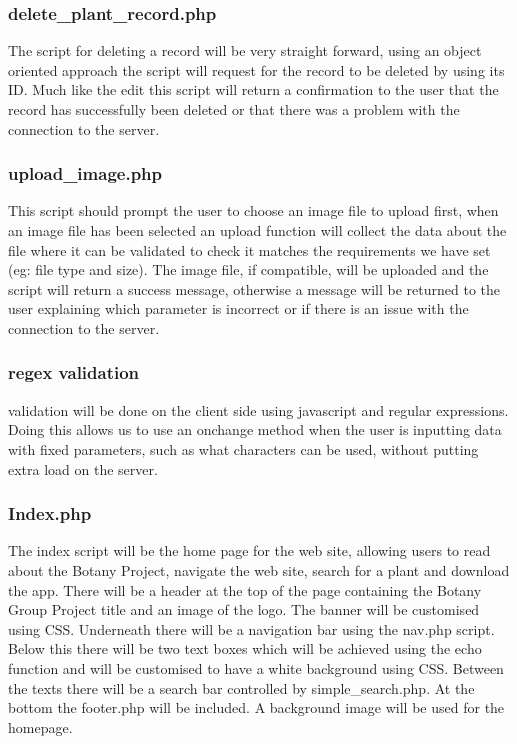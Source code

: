 	\subsubsection{delete\_plant\_record.php}
		The script for deleting a record will be very straight forward, using an object oriented approach the script will request for the record to be deleted by using its ID. Much like the edit this script will return a confirmation to the user that the record has successfully been deleted or that there was a problem with the connection to the server.

	\subsubsection{upload\_image.php}
		This script should prompt the user to choose an image file to upload first, when an image file has been selected an upload function will collect the data about the file where it can be validated to check it matches the requirements we have set (eg: file type and size). The image file, if compatible, will be uploaded and the script will return a success message, otherwise a message will be returned to the user explaining which parameter is incorrect or if there is an issue with the connection to the server.

	\subsubsection{regex validation}
		validation will be done on the client side using javascript and regular expressions. Doing this allows us to use an onchange method when the user is inputting data with fixed parameters, such as what characters can be used, without putting extra load on the server.

	\subsubsection{Index.php}
		The index script will be the home page for the web site, allowing users to read about the Botany Project, navigate the web site, search for a plant and download the app. There will be a header at the top of the page containing the Botany Group Project title and an image of the logo. The banner will be customised using CSS. Underneath there will be a navigation bar using the nav.php script. Below this there will be two text boxes which will be achieved using the echo function and will be customised to have a white background using CSS. Between the texts there will be a search bar controlled by simple\_search.php. At the bottom the footer.php will be included. A background image will be used for the homepage.

